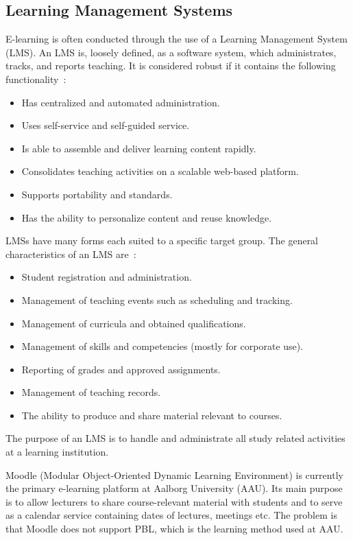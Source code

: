 \subsection{Learning Management Systems}
\label{sub:lms}
E-learning is often conducted through the use of a Learning Management System (LMS). 
An LMS is, loosely defined, as a software system, which administrates, tracks, and reports teaching. 
It is considered robust if it contains the following functionality~\citep{Ellis09}:

\begin{itemize}
	\item Has centralized and automated administration.
	\item Uses self-service and self-guided service.
	\item Is able to assemble and deliver learning content rapidly.
	\item Consolidates teaching activities on a scalable web-based platform.
	\item Supports portability and standards.
	\item Has the ability to personalize content and reuse knowledge.
\end{itemize}

LMSs have many forms each suited to a specific target group.
The general characteristics of an LMS are~\citep{Kerschenbaum}:

\begin{itemize}
	\item Student registration and administration.
	\item Management of teaching events such as scheduling and tracking.
	\item Management of curricula and obtained qualifications.
	\item Management of skills and competencies (mostly for corporate use).
	\item Reporting of grades and approved assignments.
	\item Management of teaching records.
	\item The ability to produce and share material relevant to courses.
\end{itemize}

The purpose of an LMS is to handle and administrate all study related activities at a learning institution.

Moodle (Modular Object-Oriented Dynamic Learning Environment) \citep{moodle} is currently the primary e-learning platform at Aalborg University (AAU). 
Its main purpose is to allow lecturers to share course-relevant material with students and to serve as a calendar service containing dates of lectures, meetings etc. 
The problem is that Moodle does not support PBL, which is the learning method used at AAU.

